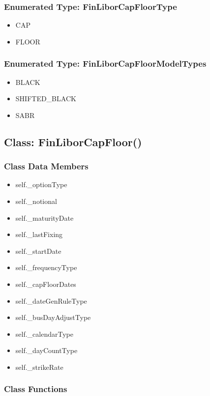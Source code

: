 \documentclass[twoside,11pt]{book}
\begin{document}
\subsubsection{Enumerated Type: FinLiborCapFloorType}
\begin{itemize}
\item{CAP}
\item{FLOOR}
\end{itemize}

\subsubsection{Enumerated Type: FinLiborCapFloorModelTypes}
\begin{itemize}
\item{BLACK}
\item{SHIFTED\_BLACK}
\item{SABR}
\end{itemize}

\subsection{Class: FinLiborCapFloor()}


\subsubsection{Class Data Members}
\begin{itemize}
\item{self.\_optionType}
\item{self.\_notional}
\item{self.\_maturityDate}
\item{self.\_lastFixing}
\item{self.\_startDate}
\item{self.\_frequencyType}
\item{self.\_capFloorDates}
\item{self.\_dateGenRuleType}
\item{self.\_busDayAdjustType}
\item{self.\_calendarType}
\item{self.\_dayCountType}
\item{self.\_strikeRate}
\end{itemize}

\subsubsection{Class Functions}
\end{document}
